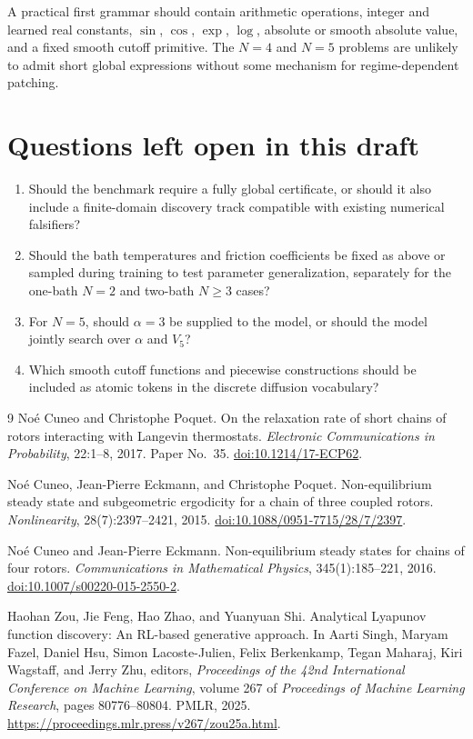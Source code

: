 \documentclass[11pt]{article}
\newcommand{\1}{\mathbf{1}}
\begin{document}
A practical first grammar should contain arithmetic operations, integer and learned real constants, $\sin$, $\cos$, $\exp$, $\log$, absolute or smooth absolute value, and a fixed smooth cutoff primitive. The $N=4$ and $N=5$ problems are unlikely to admit short global expressions without some mechanism for regime-dependent patching.

\section{Questions left open in this draft}
\begin{enumerate}[leftmargin=*,itemsep=0.75em]
\item Should the benchmark require a fully global certificate, or should it also include a finite-domain discovery track compatible with existing numerical falsifiers?
\item Should the bath temperatures and friction coefficients be fixed as above or sampled during training to test parameter generalization, separately for the one-bath $N=2$ and two-bath $N\ge3$ cases?
\item For $N=5$, should $\alpha=3$ be supplied to the model, or should the model jointly search over $\alpha$ and $V_5$?
\item Which smooth cutoff functions and piecewise constructions should be included as atomic tokens in the discrete diffusion vocabulary?
\end{enumerate}

\begin{thebibliography}{9}
Noé Cuneo and Christophe Poquet.
On the relaxation rate of short chains of rotors interacting with Langevin thermostats.
\emph{Electronic Communications in Probability}, 22:1--8, 2017. Paper No.~35.
\href{https://doi.org/10.1214/17-ECP62}{doi:10.1214/17-ECP62}.

Noé Cuneo, Jean-Pierre Eckmann, and Christophe Poquet.
Non-equilibrium steady state and subgeometric ergodicity for a chain of three coupled rotors.
\emph{Nonlinearity}, 28(7):2397--2421, 2015.
\href{https://doi.org/10.1088/0951-7715/28/7/2397}{doi:10.1088/0951-7715/28/7/2397}.

Noé Cuneo and Jean-Pierre Eckmann.
Non-equilibrium steady states for chains of four rotors.
\emph{Communications in Mathematical Physics}, 345(1):185--221, 2016.
\href{https://doi.org/10.1007/s00220-015-2550-2}{doi:10.1007/s00220-015-2550-2}.

Haohan Zou, Jie Feng, Hao Zhao, and Yuanyuan Shi.
Analytical Lyapunov function discovery: An RL-based generative approach.
In Aarti Singh, Maryam Fazel, Daniel Hsu, Simon Lacoste-Julien, Felix Berkenkamp, Tegan Maharaj, Kiri Wagstaff, and Jerry Zhu, editors,
\emph{Proceedings of the 42nd International Conference on Machine Learning}, volume 267 of \emph{Proceedings of Machine Learning Research}, pages 80776--80804. PMLR, 2025.
\url{https://proceedings.mlr.press/v267/zou25a.html}.
\end{thebibliography}
\end{document}
